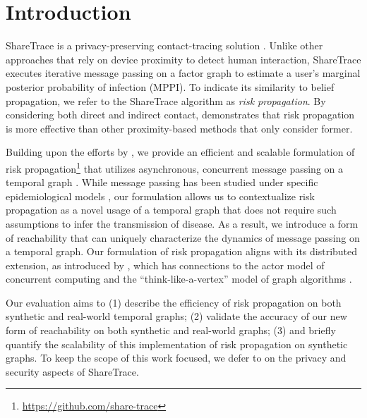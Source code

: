 \chapter{Introduction}
\par ShareTrace is a privacy-preserving contact-tracing solution \cite{Ayday2021}. Unlike other approaches that rely on device proximity to detect human interaction, ShareTrace executes iterative message passing on a factor graph to estimate a user's marginal posterior probability of infection (MPPI). To indicate its similarity to belief propagation, we refer to the ShareTrace algorithm as \emph{risk propagation}. By considering both direct and indirect contact, \cite{Ayday2021} demonstrates that risk propagation is more effective than other proximity-based methods that only consider former.

\par Building upon the efforts by \cite{Ayday2021}, we provide an efficient and scalable formulation of risk propagation\footnote{\url{https://github.com/share-trace}} that utilizes asynchronous, concurrent message passing on a temporal graph \cite{Holme2012, Holme2015}. While message passing has been studied under specific epidemiological models \cite{Karrer2010, Li2021}, our formulation allows us to contextualize risk propagation as a novel usage of a temporal graph that does not require such assumptions to infer the transmission of disease. As a result, we introduce a form of reachability that can uniquely characterize the dynamics of message passing on a temporal graph. Our formulation of risk propagation aligns with its distributed extension, as introduced by \cite{Ayday2021}, which has connections to the actor model of concurrent computing \cite{Baker1977, Agha1986} and the ``think-like-a-vertex'' model of graph algorithms \cite{McCune2015}.

\par Our evaluation aims to (1) describe the efficiency of risk propagation on both synthetic and real-world temporal graphs; (2) validate the accuracy of our new form of reachability on both synthetic and real-world graphs; (3) and briefly quantify the scalability of this implementation of risk propagation on synthetic graphs. To keep the scope of this work focused, we defer to \cite{Ayday2021} on the privacy and security aspects of ShareTrace.